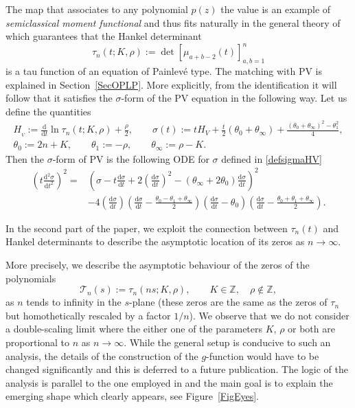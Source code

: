 \documentclass[pdftex]{sigma}
\numberwithin{equation}{section}
\theoremstyle{definition}
\def\le{\left}
\def\ri{\right}
\def \d{{\mathrm d}}
\def\be{\begin{equation}}
\def\ee{\end{equation}}
\def\Z{{\mathbb Z}}
\def\s{\sigma}
\begin{document}
The map that associates to any polynomial $p(z)$ the value \smash{$\mathcal M[p]:= \oint_{|z|=R} p(z) \d \mu(z)$} is an example of {\it semiclassical moment functional} \cite{Marcellan0, Marcellan, Maroni, Shohat} and thus fits naturally in the general theory of \cite{Bertola:Semiiso} which guarantees that the Hankel determinant
\[
\tau_n(t; {K}, {\rho} ):= \det \le[\mu_{a+b-2}(t)\ri]_{a,b=1}^n
\]
is a tau function of an equation of Painlev\'e type. The matching with PV is explained in Section~\ref{SecOPLP}.
More explicitly, from the identification it will follow that it satisfies the $\sigma$-form of the PV equation \cite[Appendix~C]{JMU2} in the following way. Let us define the quantities
\begin{gather}%
H_{_V}:= \frac {\d}{\d t} \ln \tau_n(t; {K}, {\rho} ) + \frac {\rho} 2,
\qquad
 \s(t) := t H_V + \frac t 2 (\theta_0 + \theta_\infty) + \frac { (\theta_0 + \theta_\infty)^2 - \theta_1^2}4,\nonumber
 \\
\theta_0 :=2n + { {K}}, \qquad
\theta_1 := - { {\rho}},\qquad
\theta_\infty:={ {\rho}} - { {K}}.\label{defsigmaHV}
\end{gather}
Then the $\sigma$-form of PV is the following ODE for $\sigma$ defined in \eqref{defsigmaHV}
\begin{align*}%
\le(t \frac {\d^2 \s}{\d t^2}\ri)^2 ={}& \le(
 \s - t\frac {\d \s}{\d t} + 2\le(\frac {\d \s}{\d t}\ri)^2 - (\theta_\infty + 2\theta_0) \frac {\d \s}{\d t}
 \ri)^2 \nonumber\\
 &- 4 \le(\frac {\d \s}{\d t}\ri)
 \le(\frac {\d \s}{\d t} - \frac { \theta_0 -\theta_1 + \theta_\infty}2 \ri)
 \le( \frac {\d \s}{\d t} - \theta_0 \ri)
 \le(\frac {\d \s}{\d t} - \frac { \theta_0 + \theta_1 + \theta_\infty}2 \ri).
 \end{align*}

In the second part of the paper, we exploit the connection between $\tau_n(t)$ and Hankel determinants to describe the asymptotic location of its zeros as $n\to\infty$.

More precisely, we describe the asymptotic behaviour of the zeros of the polynomials
\be
\mathcal T_n(s):=
\tau_n(ns; {K}, {\rho} ), \qquad {K}\in \Z,\quad {\rho}\not\in \Z,
\label{Pns}
\ee
as $n$ tends to infinity in the $s$-plane (these zeros are the same as the zeros of $\tau_n$ but homothetically rescaled by a factor $1/n$).
We observe that we do not consider a double-scaling limit where the either one of the parameters ${K}$, ${\rho}$ or both are proportional to $n$ as $n\to\infty$. While the general setup is conducive to such an analysis, the details of the construction of the $g$-function would have to be changed significantly and this is deferred to a future publication. The logic of the analysis is parallel to the one employed in \cite{BalBerBo,BertolaBothner} and
the main goal is to explain the emerging shape which clearly appears, see Figure~\ref{FigEyes}.
\end{document}
